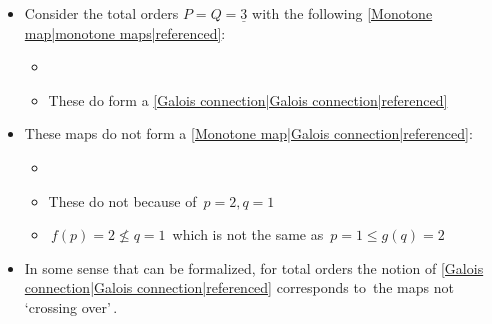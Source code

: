 

\begin{itemize}
    \item Consider the total orders $P = Q = \underline{3}$ with the following \ref{Monotone map|monotone maps|referenced}:
          \begin{itemize}
            \item {}
            \item These do form a \ref{Galois connection|Galois connection|referenced}    \end{itemize}
    \item These maps do not form a \ref{Monotone map|Galois connection|referenced}:
          \begin{itemize}
            \item {}
            \item These do not because of \,$p=2, q = 1$\,
            \item \,$f(p)=2 \not \leq q=1$\, which is not the same as \,$p = 1 \leq g(q)=2$\,    \end{itemize}
    \item In some sense that can be formalized, for total orders the notion of \ref{Galois connection|Galois connection|referenced} corresponds to \,the maps not `crossing over'\,.    \end{itemize}